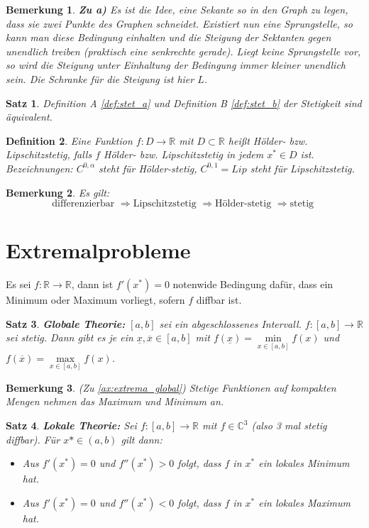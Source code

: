 \documentclass[12pt,a4paper]{article}%
\newtheorem{satz}{Satz}[section]
\newtheorem{definition}[satz]{Definition}
\newtheorem{bem}{Bemerkung}[section]
\numberwithin{equation}{section}
\newcommand{\R}{\mathbb{R}} %
\newcommand{\C}{\mathbb{C}}
\numberwithin{equation}{subsection}
\begin{document}
  \begin{bem}
  \textbf{Zu a)}
    Es ist die Idee, eine Sekante so in den Graph zu legen, dass sie zwei Punkte des Graphen schneidet. Existiert nun eine Sprungstelle, so kann man diese Bedingung einhalten und die Steigung der Sektanten gegen unendlich treiben (praktisch eine senkrechte gerade). Liegt keine Sprungstelle vor, so wird die Steigung unter Einhaltung der Bedingung immer kleiner unendlich sein. Die Schranke für die Steigung ist hier $L$.
  \end{bem}
  \begin{satz}
    Definition A \eqref{def:stet_a} und Definition B \eqref{def:stet_b} der Stetigkeit sind äquivalent.
  \end{satz}
  \begin{definition}
    Eine Funktion $f:D\rightarrow \R$ mit $D \subset \R$ heißt Hölder- bzw. Lipschitzstetig, falls $f$ Hölder- bzw. Lipschitzstetig in jedem $x^* \in D$ ist. \newline
    Bezeichnungen: $C^{0,\alpha}$ steht für Hölder-stetig, $C^{0,1} = Lip$ steht für Lipschitzstetig.
  \end{definition}
  \begin{bem}
    Es gilt:
    \begin{equation}
      \text{differenzierbar } \Rightarrow \text{Lipschitzstetig } \Rightarrow \text{Hölder-stetig } \Rightarrow \text{stetig }
    \end{equation}
  \end{bem}    
  \newpage 
  
\section{Extremalprobleme}
Es sei $f:\R \rightarrow \R$, dann ist $f'(x^*) = 0$ notenwide Bedingung dafür, dass ein Minimum oder Maximum vorliegt, sofern $f$ diffbar ist.
\begin{satz}
  \textbf{Globale Theorie: } $[a,b]$ sei ein abgeschlossenes Intervall. $f:[a,b] \rightarrow \R$ sei stetig. Dann gibt es je ein $\underline{x}, \overline{x} \in [a,b]$ mit $f(\underline{x}) = \min\limits_{x \in [a,b]}f(x)$ und $f(\overline{x}) = \max\limits_{x \in [a,b]}f(x)$.\label{ax:extrema_global}
\end{satz}
\begin{bem} (Zu \eqref{ax:extrema_global})
  Stetige Funktionen auf kompakten Mengen nehmen das Maximum und Minimum an.
\end{bem}
\begin{satz}
  \textbf{Lokale Theorie: } Sei $f:[a,b] \rightarrow \R$ mit $f\in \C^3$ (also 3 mal stetig diffbar). Für $x* \in (a,b)$ gilt dann:
  \begin{itemize}
    \item[a) ] Aus $f'(x^*) = 0$ und $f''(x^*) > 0$ folgt, dass $f$ in $x^*$ ein lokales Minimum hat.
    \item[b) ] Aus $f'(x^*) = 0$ und $f''(x^*) < 0$ folgt, dass $f$ in $x^*$ ein lokales Maximum hat.
  \end{itemize}
\end{satz}
\newpage
\end{document}
